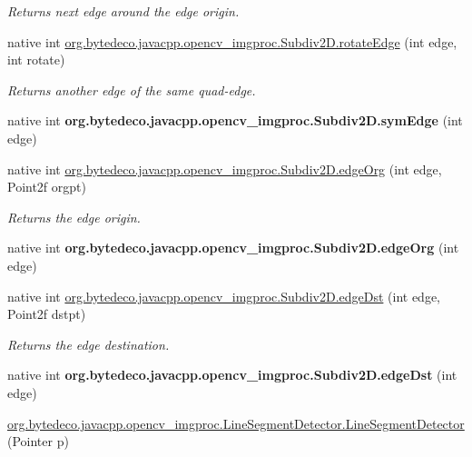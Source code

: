 \begin{DoxyCompactItemize}
\begin{DoxyCompactList}\small\item\em Returns next edge around the edge origin. \end{DoxyCompactList}\item 
native int \hyperlink{group__imgproc_gabfc2f5bafd97c684939d0d74ee719f70}{org.\+bytedeco.\+javacpp.\+opencv\+\_\+imgproc.\+Subdiv2\+D.\+rotate\+Edge} (int edge, int rotate)
\begin{DoxyCompactList}\small\item\em Returns another edge of the same quad-\/edge. \end{DoxyCompactList}\item 
\mbox{\label{group__imgproc_ga522580894a4d22ee75de4c8f4f6eb051}} 
native int {\bfseries org.\+bytedeco.\+javacpp.\+opencv\+\_\+imgproc.\+Subdiv2\+D.\+sym\+Edge} (int edge)
\item 
native int \hyperlink{group__imgproc_gac70cf2d7562d68ab618249b422182e99}{org.\+bytedeco.\+javacpp.\+opencv\+\_\+imgproc.\+Subdiv2\+D.\+edge\+Org} (int edge, Point2f orgpt)
\begin{DoxyCompactList}\small\item\em Returns the edge origin. \end{DoxyCompactList}\item 
\mbox{\label{group__imgproc_gadd010a908a321aa4d5d72fc256da118e}} 
native int {\bfseries org.\+bytedeco.\+javacpp.\+opencv\+\_\+imgproc.\+Subdiv2\+D.\+edge\+Org} (int edge)
\item 
native int \hyperlink{group__imgproc_gad2814006051bf55fa95077d3578347fb}{org.\+bytedeco.\+javacpp.\+opencv\+\_\+imgproc.\+Subdiv2\+D.\+edge\+Dst} (int edge, Point2f dstpt)
\begin{DoxyCompactList}\small\item\em Returns the edge destination. \end{DoxyCompactList}\item 
\mbox{\label{group__imgproc_gad5bb2928dabde6a8ec05955b50560f31}} 
native int {\bfseries org.\+bytedeco.\+javacpp.\+opencv\+\_\+imgproc.\+Subdiv2\+D.\+edge\+Dst} (int edge)
\item 
\hyperlink{group__imgproc_gaf6bdbba75ec1ba94f3775caa208c7d94}{org.\+bytedeco.\+javacpp.\+opencv\+\_\+imgproc.\+Line\+Segment\+Detector.\+Line\+Segment\+Detector} (Pointer p)
\item 

\end{DoxyCompactItemize}
